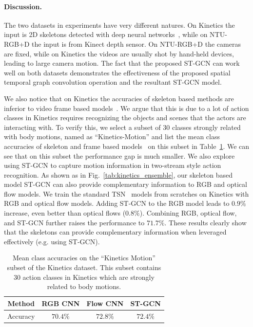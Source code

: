 \documentclass[letterpaper]{article} %
\begin{document}
\paragraph{Discussion.}
The two datasets in experiments have very different natures. 
On Kinetics the input is 2D skeletons detected with deep neural networks~\cite{Cao2017CVPR}, while on NTU-RGB+D the input is from Kinect depth sensor.
On NTU-RGB+D the cameras are fixed, while on Kinetics the videos are usually shot by hand-held devices, leading to large camera motion.
The fact that the proposed ST-GCN can work well on both datasets demonstrates the effectiveness of the proposed spatial temporal graph convolution operation and the resultant ST-GCN model.

We also notice that on Kinetics the accuracies of skeleton based methods are inferior to video frame based models~\cite{Kay2017Kinetics}. 
We argue that this is due to a lot of action classes in Kinetics requires recognizing the objects and scenes that the actors are interacting with. 
To verify this, we select a subset of $ 30 $ classes strongly related with body motions, named as ``Kinetics-Motion'' and list the mean class accuracies of skeleton and frame based models~\cite{Kay2017Kinetics} on this subset in Table~\ref{tab:kinetics_motion}. 
We can see that on this subset the performance gap is much smaller. 
We also explore using ST-GCN to capture motion information in two-stream style action recognition. 
As shown as in Fig.~\ref{tab:kinetics_ensemble}, our skeleton based model ST-GCN can also provide complementary information to RGB and optical flow models. 
We train the standard TSN~\cite{TSN2016ECCV} models from scratches on Kinetics with RGB and optical flow models. Adding ST-GCN to the RGB model leads to $0.9\%$ increase, even better than optical flows ($0.8\% $).  Combining RGB, optical flow, and ST-GCN further raises the performance to $71.7\%$. 
These results clearly show that the skeletons can provide complementary information when leveraged effectively (e.g. using ST-GCN).


\begin{table}
	\centering
	\begin{tabular}{c|c|c|c}\hline
		Method & RGB CNN & Flow CNN & ST-GCN \\ \hline
		Accuracy & $ 70.4\% $ & $ 72.8\% $ & $72.4\%$ \\ \hline
	\end{tabular}
	\caption{Mean class accuracies on the ``Kinetics Motion'' subset of the Kinetics dataset. This subset contains 
	$ 30 $ action classes in Kinetics which are strongly related to body motions.}\label{tab:kinetics_motion}
\end{table}
\end{document}
